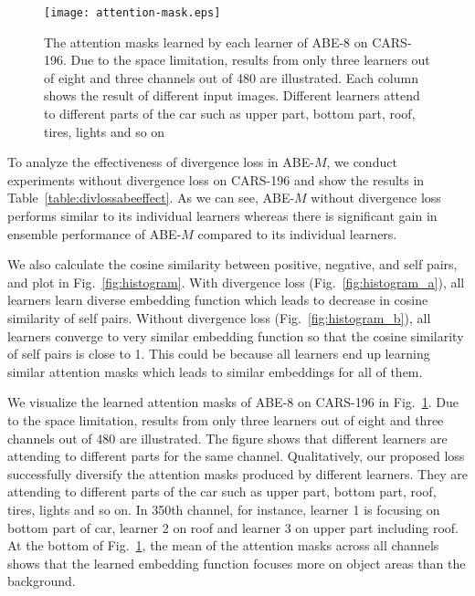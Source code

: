 \documentclass[runningheads]{llncs}
\begin{document}
\begin{figure}[t]
\centering
\texttt{[image: attention-mask.eps]}
\caption{The attention masks learned by each learner of ABE-8 on CARS-196. Due to the space limitation, results from only three learners out of eight and three channels out of 480 are illustrated. Each column shows the result of different input images. Different learners attend to different parts of the car such as upper part, bottom part, roof, tires, lights and so on}
\label{fig:mask}
\end{figure}



To analyze the effectiveness of divergence loss in ABE-$M$, we conduct experiments without divergence loss on CARS-196 and show the results in Table~\ref{table:divlossabeeffect}.
As we can see, ABE-$M$ without divergence loss performs similar to its individual learners whereas there is significant gain in ensemble performance of ABE-$M$ compared to its individual learners.

We also calculate the cosine similarity between positive, negative, and self pairs, and plot in Fig.~\ref{fig:histogram}.
With divergence loss (Fig.~\ref{fig:histogram_a}), all learners learn diverse embedding function which leads to decrease in cosine similarity of self pairs.
Without divergence loss (Fig.~\ref{fig:histogram_b}), all learners converge to very similar embedding function so that the cosine similarity of self pairs is close to 1.
This could be because all learners end up learning similar attention masks which leads to similar embeddings for all of them.


We visualize the learned attention masks of ABE-8 on CARS-196 in Fig.~\ref{fig:mask}.
Due to the space limitation, results from only three learners out of eight and three channels out of 480 are illustrated.
The figure shows that different learners are attending to different parts for the same channel.
Qualitatively, our proposed loss successfully diversify the attention masks produced by different learners.
They are attending to different parts of the car such as upper part, bottom part, roof, tires, lights and so on.
In 350th channel, for instance, learner 1 is focusing on bottom part of car, learner 2 on roof and learner 3 on upper part including roof.
At the bottom of Fig.~\ref{fig:mask}, the mean of the attention masks across all channels shows that the learned embedding function focuses more on object areas than the background.
\end{document}

